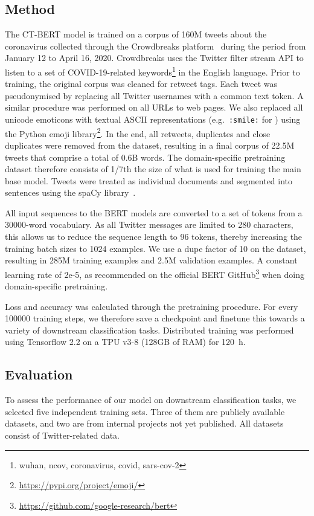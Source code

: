 \documentclass{article}
\begin{document}
\begin{multicols}{2}
\section{Method}
\label{sec:method}
The \textsc{CT-BERT} model is trained on a corpus of \num{160}M tweets about the coronavirus collected through the Crowdbreaks platform~\cite{muller2019crowdbreaks} during the period from January 12 to April 16, 2020.
Crowdbreaks uses the Twitter filter stream API to listen to a set of COVID-19-related keywords\footnote{wuhan, ncov, coronavirus, covid, sars-cov-2} in the English language.
Prior to training, the original corpus was cleaned for retweet tags.
Each tweet was pseudonymised by replacing all Twitter usernames with a common text token.
A similar procedure was performed on all URLs to web pages.
  We also replaced all unicode emoticons with textual ASCII representations (e.g.\ \texttt{:smile:} for \smiley) using the Python emoji library\footnote{\url{https://pypi.org/project/emoji/}}.
In the end, all retweets, duplicates and close duplicates were removed from the dataset, resulting in a final corpus of 22.5M tweets that comprise a total of 0.6B words.
The domain-specific pretraining dataset therefore consists of 1/7th the size of what is used for training the main base model.
Tweets were treated as individual documents and segmented into sentences using the spaCy library~\cite{honnibal2017spacy}.

All input sequences to the BERT models are converted to a set of tokens from a \num{30000}-word vocabulary.
As all Twitter messages are limited to 280 characters, this allows us to reduce the sequence length to 96 tokens, thereby increasing the training batch sizes to \num{1024} examples.
We use a dupe factor of 10 on the dataset, resulting in 285M training examples and 2.5M validation examples.
A constant learning rate of 2e-5, as recommended on the official BERT GitHub\footnote{\url{https://github.com/google-research/bert}} when doing domain-specific pretraining.

Loss and accuracy was calculated through the pretraining procedure.
For every \num{100000} training steps, we therefore save a checkpoint and finetune this towards a variety of downstream classification tasks.
Distributed training was performed using Tensorflow 2.2 on a TPU v3-8 (128GB of RAM) for \SI{120}{\hour}.
\subsection{Evaluation}
To assess the performance of our model on downstream classification tasks, we selected five independent training sets.
Three of them are publicly available datasets, and two are from internal projects not yet published.
All datasets consist of Twitter-related data.


\end{multicols}
\end{document}
